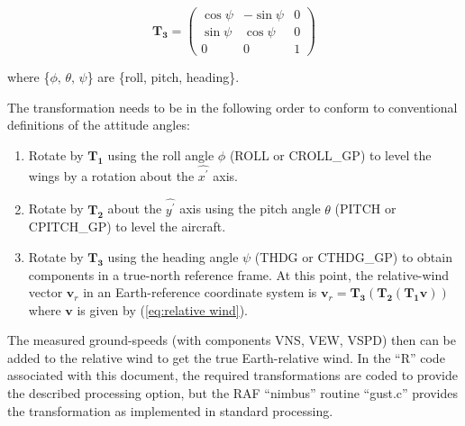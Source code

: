 \documentclass[12pt,twoside,english]{article}\usepackage[]{graphicx}\usepackage[]{color}
\let\OrgIndex\index
\renewcommand*{\index}[1]{\OrgIndex{#1}}
\begin{document}
\[
\mathbf{T_{3}}=\left(\begin{array}{ccc}
\cos\psi & -\sin\psi & 0\\ 
\sin\psi & \cos\psi & 0\\ 0 & 0 & 1 
\end{array}\right) 
\]


where \{$\phi,\,\theta,\,\psi$\} are \{roll, pitch, heading\}. 

The transformation needs to be in the following order to conform to conventional definitions of the attitude angles:  
\begin{enumerate}
\item Rotate by $\mathbf{T_{1}}$ using the roll angle $\phi$ (ROLL or CROLL\_GP) to level the wings by a rotation about the $\hat{x^{\prime}}$ axis.  
\item Rotate by $\mathbf{T_{2}}$ about the $\hat{y^{\prime}}$ axis using the pitch angle $\theta$ (PITCH or CPITCH\_GP) to level the aircraft.  
\item Rotate by $\mathbf{T_{3}}$ using the heading angle $\psi$ (THDG or CTHDG\_GP) to obtain components in a true-north reference frame. At this point, the relative-wind vector $\mathbf{v}_r$ in an Earth-reference coordinate system is $\mathbf{v}_{r}=\mathbf{T_{3}}(\mathbf{T_{2}}(\mathbf{T_{1}}\mathbf{v}))$ where $\mathbf{v}$ is given by (\ref{eq:relative wind}).  
\end{enumerate}
The measured ground-speeds (with components VNS, VEW, VSPD) then can be added to the relative wind to get the true Earth-relative wind. In the ``R'' code associated with this document, the required transformations are coded to provide the described processing option, but the RAF ``nimbus'' routine ``gust.c'' provides the transformation as implemented in standard processing. 
\end{document}
